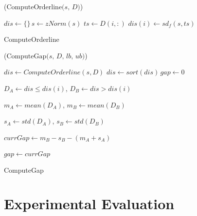 \begin{algorithm}[h]
\DontPrintSemicolon
{}

\Begin($\text{ComputeOrderline} {(} s, \, D{)}$)
{
  $dis \leftarrow \{\} \, s \leftarrow zNorm(s)$\;
  {
    $ts \leftarrow D(i,:)$\;
    $dis(i) \leftarrow sd_f(s,ts)$\;    
  }  

}
\caption{ComputeOrderline}
\label{algo1}
\end{algorithm}



\begin{algorithm}[h]
\DontPrintSemicolon
{}

\Begin($\text{ComputeGap} {(} s, \, D, \, lb, \, ub{)}$)
{
  $dis \leftarrow ComputeOrderline(s,D)$\;
  $dis \leftarrow sort(dis)\, gap \leftarrow 0$\;

  
    {
        $D_A \leftarrow dis \leq dis(i)$,
        $D_B \leftarrow dis > dis(i)$
     
       $m_A \leftarrow mean(D_A) $,
       $ m_B \leftarrow mean(D_B)$\;
       
       $s_A \leftarrow std(D_A)$,
       $s_B \leftarrow std(D_B)$\;
       
       $currGap \leftarrow m_B - s_B - (m_A + s_A)$
       
       {
       	$gap \leftarrow currGap$
       } 
      
    }  

}
\caption{ComputeGap}
\label{algo2}
\end{algorithm}

\section[Experiments]{Experimental Evaluation}

